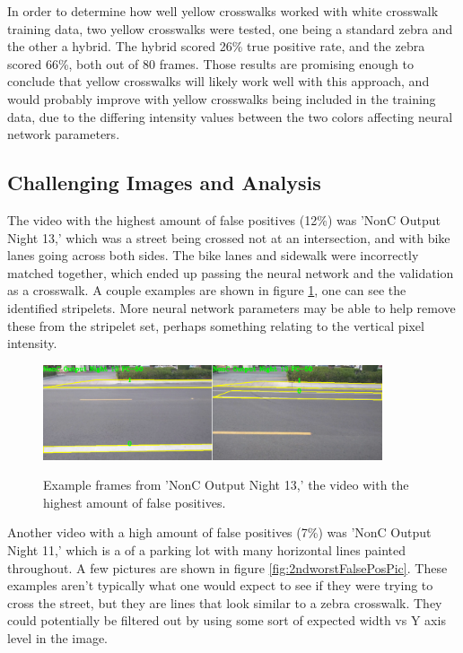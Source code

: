 \documentclass[12pt]{ucthesis}
\newcommand{\captionfonts}{\small\bf\ssp}
\begin{document}
In order to determine how well yellow crosswalks worked with white crosswalk training data, two yellow crosswalks were tested, one being a standard zebra and the other a hybrid. The hybrid scored 26\% true positive rate, and the zebra scored 66\%, both out of 80 frames. Those results are promising enough to conclude that yellow crosswalks will likely work well with this approach, and would probably improve with yellow crosswalks being included in the training data, due to the differing intensity values between the two colors affecting neural network parameters. 

\subsection{Challenging Images and Analysis}

The video with the highest amount of false positives (12\%) was 'NonC Output Night 13,' which was a street being crossed not at an intersection, and with bike lanes going across both sides. The bike lanes and sidewalk were incorrectly matched together, which ended up passing the neural network and the validation as a crosswalk. A couple examples are shown in figure \ref{fig:worstFalsePosPic}, one can see the identified stripelets. More neural network parameters may be able to help remove these from the stripelet set, perhaps something relating to the vertical pixel intensity. 

\begin{figure}[t]
\begin{center}
\includegraphics[width=10cm]{NonCWorstCwalk.png}
\captionfonts
\caption[Worst False Positive Examples]{Example frames from 'NonC Output Night 13,' the video with the highest amount of false positives.}
\label{fig:worstFalsePosPic}
\end{center}
\end{figure}

Another video with a high amount of false positives (7\%) was 'NonC Output Night 11,' which is a of a parking lot with many horizontal lines painted throughout.  A few pictures are shown in figure \ref{fig:2ndworstFalsePosPic}. These examples aren't typically what one would expect to see if they were trying to cross the street, but they are lines that look similar to a zebra crosswalk. They could potentially be filtered out by using some sort of expected width vs Y axis level in the image. 
\end{document}
